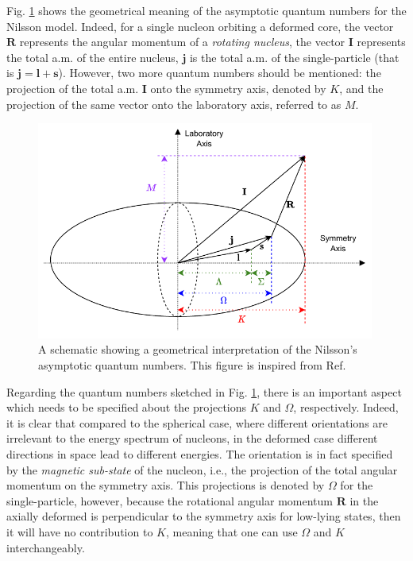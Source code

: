 Fig. \ref{fig-nilsson-quantum-numbers} shows the geometrical meaning of the asymptotic quantum numbers for the Nilsson model. Indeed, for a single nucleon orbiting a deformed core, the vector $\mathbf{R}$ represents the angular momentum of a \emph{rotating nucleus}, the vector $\mathbf{I}$ represents the total a.m. of the entire nucleus, $\mathbf{j}$ is the total a.m. of the single-particle (that is $\mathbf{j}=\mathbf{l}+\mathbf{s}$). However, two more quantum numbers should be mentioned: the projection of the total a.m. $\mathbf{I}$ onto the symmetry axis, denoted by $K$, and the projection of the same vector onto the laboratory axis, referred to as $M$.
\begin{figure}
    \centering
    \includegraphics[width=0.99\textwidth]{Chapters/Figures/nilsson_quantum_numbers.pdf}
    \caption{A schematic showing a geometrical interpretation of the Nilsson's asymptotic quantum numbers. This figure is inspired from Ref. \cite{garnsworthy2007neutron}}
    \label{fig-nilsson-quantum-numbers}
\end{figure}

Regarding the quantum numbers sketched in Fig. \ref{fig-nilsson-quantum-numbers}, there is an important aspect which needs to be specified about the projections $K$ and $\Omega$, respectively. Indeed, it is clear that compared to the spherical case, where different orientations are irrelevant to the energy spectrum of nucleons, in the deformed case different directions in space lead to different energies. The orientation is in fact specified by the \emph{magnetic sub-state} of the nucleon, i.e., the projection of the total angular momentum on the symmetry axis. This projections is denoted by $\Omega$ for the single-particle, however, because the rotational angular momentum $\mathbf{R}$ in the axially deformed is perpendicular to the symmetry axis for low-lying states, then it will have no contribution to $K$, meaning that one can use $\Omega$ and $K$ interchangeably.

